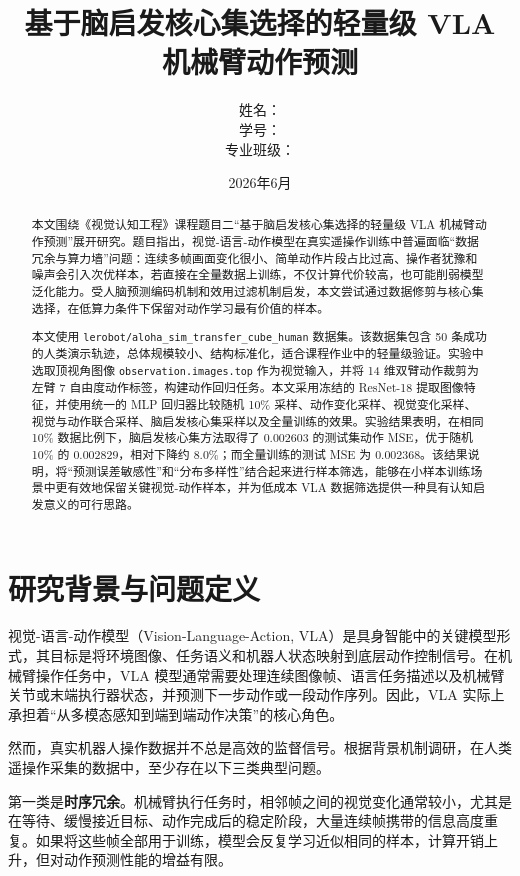 \documentclass[UTF8,a4paper,12pt]{ctexart}
\title{基于脑启发核心集选择的轻量级 VLA 机械臂动作预测}
\author{
  姓名：\underline{\hspace{4cm}} \\
  学号：\underline{\hspace{4cm}} \\
  专业班级：\underline{\hspace{4cm}}
}
\date{2026年6月}
\begin{document}
\maketitle

\begin{abstract}
本文围绕《视觉认知工程》课程题目二“基于脑启发核心集选择的轻量级 VLA 机械臂动作预测”展开研究。题目指出，视觉-语言-动作模型在真实遥操作训练中普遍面临“数据冗余与算力墙”问题：连续多帧画面变化很小、简单动作片段占比过高、操作者犹豫和噪声会引入次优样本，若直接在全量数据上训练，不仅计算代价较高，也可能削弱模型泛化能力。受人脑预测编码机制和效用过滤机制启发，本文尝试通过数据修剪与核心集选择，在低算力条件下保留对动作学习最有价值的样本。

本文使用 \texttt{lerobot/aloha\_sim\_transfer\_cube\_human} 数据集。该数据集包含 50 条成功的人类演示轨迹，总体规模较小、结构标准化，适合课程作业中的轻量级验证。实验中选取顶视角图像 \texttt{observation.images.top} 作为视觉输入，并将 14 维双臂动作裁剪为左臂 7 自由度动作标签，构建动作回归任务。本文采用冻结的 ResNet-18 提取图像特征，并使用统一的 MLP 回归器比较随机 10\% 采样、动作变化采样、视觉变化采样、视觉与动作联合采样、脑启发核心集采样以及全量训练的效果。实验结果表明，在相同 10\% 数据比例下，脑启发核心集方法取得了 $0.002603$ 的测试集动作 MSE，优于随机 10\% 的 $0.002829$，相对下降约 $8.0\%$；而全量训练的测试 MSE 为 $0.002368$。该结果说明，将“预测误差敏感性”和“分布多样性”结合起来进行样本筛选，能够在小样本训练场景中更有效地保留关键视觉-动作样本，并为低成本 VLA 数据筛选提供一种具有认知启发意义的可行思路。
\end{abstract}

\tableofcontents

\section{研究背景与问题定义}

视觉-语言-动作模型（Vision-Language-Action, VLA）是具身智能中的关键模型形式，其目标是将环境图像、任务语义和机器人状态映射到底层动作控制信号。在机械臂操作任务中，VLA 模型通常需要处理连续图像帧、语言任务描述以及机械臂关节或末端执行器状态，并预测下一步动作或一段动作序列。因此，VLA 实际上承担着“从多模态感知到端到端动作决策”的核心角色。

然而，真实机器人操作数据并不总是高效的监督信号。根据背景机制调研，在人类遥操作采集的数据中，至少存在以下三类典型问题。

第一类是\textbf{时序冗余}。机械臂执行任务时，相邻帧之间的视觉变化通常较小，尤其是在等待、缓慢接近目标、动作完成后的稳定阶段，大量连续帧携带的信息高度重复。如果将这些帧全部用于训练，模型会反复学习近似相同的样本，计算开销上升，但对动作预测性能的增益有限。
\end{document}
